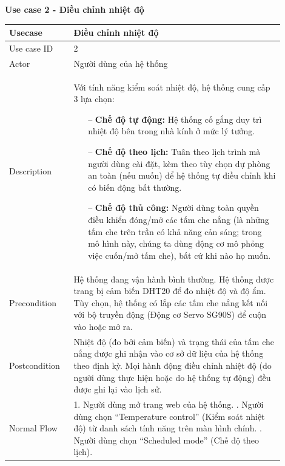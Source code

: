 \textbf{Use case 2 - Điều chỉnh nhiệt độ}
\renewcommand{\arraystretch}{1.6}
\begin{table}[H]
\centering
\begin{tabular}{|p{0.2\linewidth}|p{0.7\linewidth}|}
\hline
\rowcolor[HTML]{EFEFEF} 
\textbf{Usecase}        & \textbf{Điều chỉnh nhiệt độ} \\ \hline
Use case ID             & 2 \\ \hline
Actor                   & Người dùng của hệ thống \\ \hline
Description             & 
    Với tính năng kiểm soát nhiệt độ, hệ thống cung cấp 3 lựa chọn:
    \begin{itemize}
        \item [--] \textbf{Chế độ tự động:} Hệ thống cố gắng duy trì nhiệt độ bên trong nhà kính ở mức lý tưởng.
        \item [--] \textbf{Chế độ theo lịch:} Tuân theo lịch trình mà người dùng cài đặt, kèm theo tùy chọn dự phòng an toàn (nếu muốn) để hệ thống tự điều chỉnh khi có biến động bất thường.
        \item [--] \textbf{Chế độ thủ công:} Người dùng toàn quyền điều khiển đóng/mở các tấm che nắng (là những tấm che trên trần có khả năng cản sáng; trong mô hình này, chúng ta dùng động cơ mô phỏng việc cuốn/mở tấm che), bất cứ khi nào họ muốn.
    \end{itemize}
\\ \hline
Precondition            & 
Hệ thống đang vận hành bình thường. \newline
Hệ thống được trang bị cảm biến DHT20 để đo nhiệt độ và độ ẩm. \newline
Tùy chọn, hệ thống có lắp các tấm che nắng kết nối với bộ truyền động (Động cơ Servo SG90S) để cuộn vào hoặc mở ra. 
\\ \hline
Postcondition           & 
Nhiệt độ (đo bởi cảm biến) và trạng thái của tấm che nắng được ghi nhận vào cơ sở dữ liệu của hệ thống theo định kỳ. \newline
Mọi hành động điều chỉnh nhiệt độ (do người dùng thực hiện hoặc do hệ thống tự động) đều được ghi lại vào lịch sử.
\\ \hline
Normal Flow             & 
1. Người dùng mở trang web của hệ thống. \newline
2. Người dùng chọn “Temperature control” (Kiểm soát nhiệt độ) từ danh sách tính năng trên màn hình chính. \newline
3. Người dùng chọn “Scheduled mode” (Chế độ theo lịch). \newline

\end{tabular}
\end{table}
